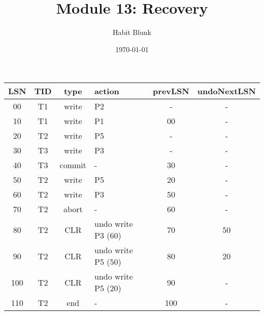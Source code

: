 \documentclass[fleqn]{article}
\title{Module 13: Recovery}
\author{Habit Blunk}
\date{\today}
\begin{document}
\maketitle

\begin{table}[h!]
\centering
  \begin{tabular}{|c|c|c|l|c|c|}
  \hline
    \textbf{LSN} & \textbf{TID} & \textbf{type} & \textbf{action} & \textbf{prevLSN} & \textbf{undoNextLSN} \\
  \hline
    00  & T1  & write & P2                  & -   & -   \\
    10  & T1  & write & P1                  & 00  & -   \\
    20  & T2  & write & P5                  & -   & -   \\
    30  & T3  & write & P3                  & -   & -   \\
    40  & T3  & commit & -                  & 30  & -   \\
    50  & T2  & write & P5                  & 20  & -   \\
    60  & T2  & write & P3                  & 50  & -   \\
    70  & T2  & abort & -                   & 60  & -   \\
    80  & T2  & CLR   & undo write P3 (60)  & 70  & 50  \\
    90  & T2  & CLR   & undo write P5 (50)  & 80  & 20  \\
    100 & T2  & CLR   & undo write P5 (20)  & 90  & -   \\
    110 & T2  & end   & -                   & 100 & -   \\
  \hline
  \end{tabular}
\end{table}
\end{document}
